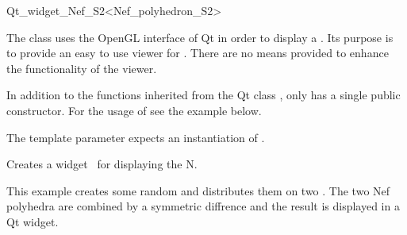 
\ccRefPageBegin



\begin{ccRefClass}{Qt_widget_Nef_S2<Nef_polyhedron_S2>}

\ccDefinition
 
The class  uses the OpenGL interface of Qt in order to 
display a
. Its purpose is to provide an easy to use viewer for 
. There are no means provided to enhance the 
functionality of the viewer.

In addition to the functions inherited from the Qt class , 
 only has a single public 
constructor. For the usage of  see the example 
below.


\ccParameters
The template parameter expects an instantiation of .


\ccCreation
{}

{Creates a widget \ccVar\ for displaying the  N.}

\ccSeeAlso


\ccExample
This example creates some random  and distributes them on
two . The two Nef polyhedra are combined by a symmetric
diffrence and the result is displayed in a Qt widget.


\end{ccRefClass}

\ccRefPageEnd
